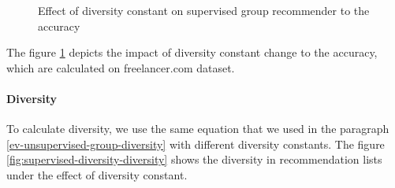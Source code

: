 \begin{figure}[htpb]
	\centering
	
	\exampleA
	\exampleB
	\caption[Accuracy in Diverse Supervised Group Recommender]{Effect of diversity constant on supervised group recommender to the accuracy}\label{fig:supervised-diversity-accuracy}
\end{figure}

The figure \ref{fig:supervised-diversity-accuracy} depicts the impact of diversity constant change to the accuracy, which are calculated on freelancer.com dataset.

\paragraph{Diversity}

To calculate diversity, we use the same equation that we used in the paragraph \ref{ev-unsupervised-group-diversity} with different diversity constants. The figure \ref{fig:supervised-diversity-diversity} shows the diversity in recommendation lists under the effect of diversity constant.


